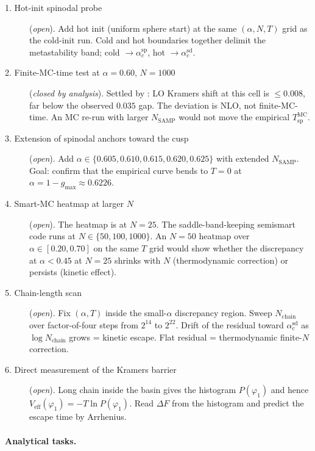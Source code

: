 \documentclass[11pt]{article}
\newcommand{\acSd}{\alpha_c^{\mathrm{sd}}}
\newcommand{\acSp}{\alpha_c^{\mathrm{sp}}}
\newcommand{\Tsp}{T_{\mathrm{sp}}}
\begin{document}
\begin{description}
\item[1. Hot-init spinodal probe] (\emph{open}).
Add hot init (uniform sphere start) at the same
$(\alpha, N, T)$ grid as the cold-init run.  Cold and hot boundaries
together delimit the metastability band; cold $\to \acSp$,
hot $\to \acSd$.

\item[2. Finite-MC-time test at $\alpha = 0.60$, $N = 1000$]
(\emph{closed by analysis}).
Settled by : LO Kramers shift at this cell is
$\le 0.008$, far below the observed $0.035$ gap.  The deviation is
NLO, not finite-MC-time.  An MC re-run with larger
$N_{\mathrm{SAMP}}$ would not move the empirical $\Tsp^{\mathrm{MC}}$.

\item[3. Extension of spinodal anchors toward the cusp]
(\emph{open}).
Add $\alpha \in \{0.605, 0.610, 0.615, 0.620, 0.625\}$ with
extended $N_{\mathrm{SAMP}}$.  Goal: confirm that the empirical curve
bends to $T = 0$ at $\alpha = 1 - g_{\max} \approx 0.6226$.

\item[4. Smart-MC heatmap at larger $N$]
(\emph{open}).
The heatmap is at $N = 25$.  The saddle-band-keeping semismart code
runs at $N \in \{50, 100, 1000\}$.  An $N = 50$ heatmap over
$\alpha \in [0.20, 0.70]$ on the same $T$ grid would show whether the
discrepancy at $\alpha < 0.45$ at $N = 25$ shrinks with $N$
(thermodynamic correction) or persists (kinetic effect).

\item[5. Chain-length scan]
(\emph{open}).
Fix $(\alpha, T)$ inside the small-$\alpha$ discrepancy
region.  Sweep $N_{\mathrm{chain}}$ over factor-of-four steps from
$2^{14}$ to $2^{22}$.  Drift of the residual toward $\acSd$ as
$\log N_{\mathrm{chain}}$ grows = kinetic escape.  Flat residual =
thermodynamic finite-$N$ correction.

\item[6. Direct measurement of the Kramers barrier]
(\emph{open}).
Long chain inside the basin gives the histogram
$P(\varphi_1)$ and hence $V_{\mathrm{eff}}(\varphi_1) = -T \ln
P(\varphi_1)$.  Read $\Delta F$ from the histogram and predict the
escape time by Arrhenius.

\end{description}

\paragraph{Analytical tasks.}
\end{document}
